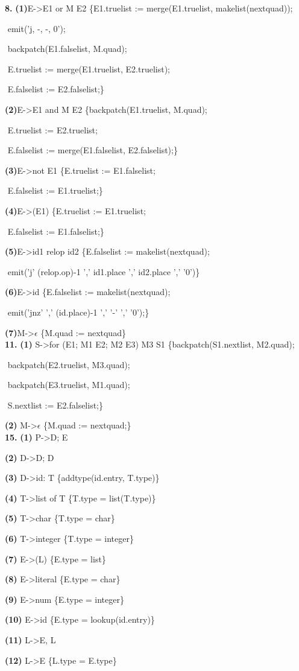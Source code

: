 \documentclass{article}
\begin{document}
\textbf{8.}
\textbf{(1)}E->E1 or M E2 \{E1.truelist := merge(E1.truelist, makelist(nextquad));

​ emit('j, -, -, 0');

​ backpatch(E1.falselist, M.quad);

​ E.truelist := merge(E1.truelist, E2.truelist);

​ E.falselist := E2.falselist;\}

\textbf{(2)}E->E1 and M E2 \{backpatch(E1.truelist, M.quad);

​ E.truelist := E2.truelist;

​ E.falselist := merge(E1.falselist, E2.falselist);\}

\textbf{(3)}E->not E1 \{E.truelist := E1.falselist;

​ E.falselist := E1.truelist;\}

\textbf{(4)}E->(E1) \{E.truelist := E1.truelist;

​ E.falselist := E1.falselist;\}

\textbf{(5)}E->id1 relop id2 \{E.falselist := makelist(nextquad);

​ emit('j' (relop.op)-1 ',' id1.place ',' id2.place ',' '0')\}

\textbf{(6)}E->id \{E.falselist := makelist(nextquad);

​ emit('jnz' ',' (id.place)-1 ',' '-' ',' '0');\}

\textbf{(7)}M->$\epsilon$ \{M.quad := nextquad\}\\

\textbf{11.}
\textbf{(1)} S->for (E1; M1 E2; M2 E3) M3 S1 \{backpatch(S1.nextlist, M2.quad);

​ backpatch(E2.truelist, M3.quad);

​ backpatch(E3.truelist, M1.quad);

​ S.nextlist := E2.falselist;\}

\textbf{(2)} M->$\epsilon$ \{M.quad := nextquad;\}\\

\textbf{15.}
\textbf{(1)} P->D; E

\textbf{(2)} D->D; D

\textbf{(3)} D->id: T \{addtype(id.entry, T.type)\}

\textbf{(4)} T->list of T \{T.type = list(T.type)\}

\textbf{(5)} T->char \{T.type = char\}

\textbf{(6)} T->integer \{T.type = integer\}

\textbf{(7)} E->(L) \{E.type = list\}

\textbf{(8)} E->literal \{E.type = char\}

\textbf{(9)} E->num \{E.type = integer\}

\textbf{(10)} E->id \{E.type = lookup(id.entry)\}

\textbf{(11)} L->E, L

\textbf{(12)} L->E \{L.type = E.type\}
\end{document}
